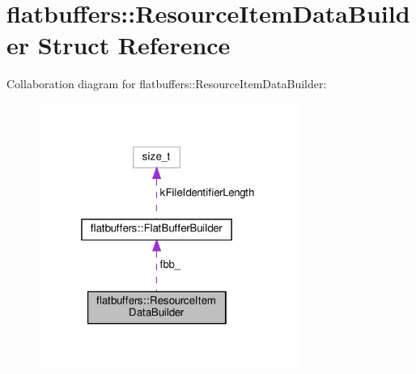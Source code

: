 \hypertarget{structflatbuffers_1_1ResourceItemDataBuilder}{}\section{flatbuffers\+:\+:Resource\+Item\+Data\+Builder Struct Reference}
\label{structflatbuffers_1_1ResourceItemDataBuilder}


Collaboration diagram for flatbuffers\+:\+:Resource\+Item\+Data\+Builder\+:
\nopagebreak
\begin{figure}[H]
\begin{center}
\leavevmode
\includegraphics[width=241pt]{structflatbuffers_1_1ResourceItemDataBuilder__coll__graph}
\end{center}
\end{figure}
